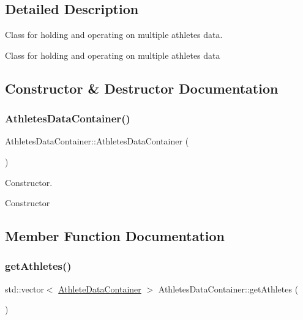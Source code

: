 \subsection{Detailed Description}
Class for holding and operating on multiple athletes data. 

Class for holding and operating on multiple athletes data 

\subsection{Constructor \& Destructor Documentation}
\mbox{\label{classAthletesDataContainer_a2c04d6c080a99c14fb7bb71055356368}} 
\subsubsection{\texorpdfstring{AthletesDataContainer()}{AthletesDataContainer()}}
{\footnotesize\ttfamily Athletes\+Data\+Container\+::\+Athletes\+Data\+Container (\begin{DoxyParamCaption}{ }\end{DoxyParamCaption})}



Constructor. 

Constructor 

\subsection{Member Function Documentation}
\mbox{\label{classAthletesDataContainer_aab7693b0ba7095c91afa6b4c4c687522}} 
\subsubsection{\texorpdfstring{getAthletes()}{getAthletes()}}
{\footnotesize\ttfamily std\+::vector$<$ \mbox{\hyperlink{classAthleteDataContainer}{Athlete\+Data\+Container}} $>$ Athletes\+Data\+Container\+::get\+Athletes (\begin{DoxyParamCaption}{ }\end{DoxyParamCaption})}



